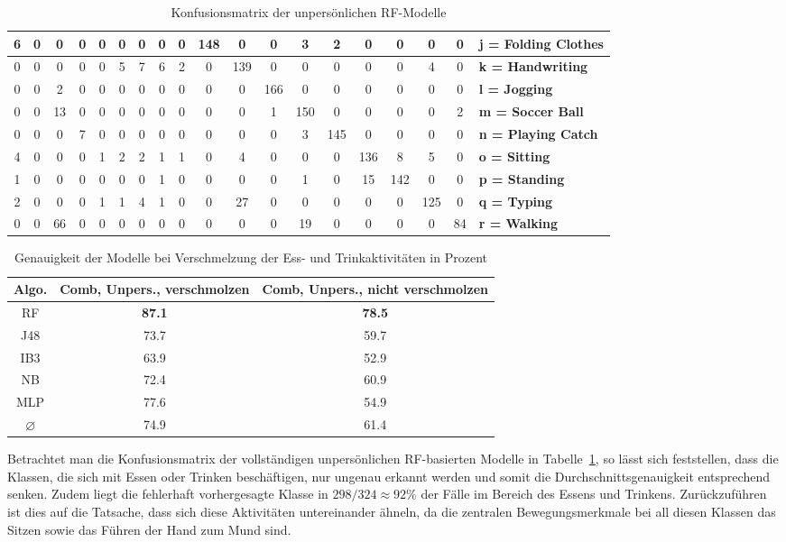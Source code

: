\begin{table}
\begin{tabular}{|c|c|c|c|c|c|c|c|c|c|c|c|c|c|c|c|c|c||l|}
\hline 
6 & 0 & 0 & 0 & 0 & 0 & 0 & 0 & 0 & 148 & 0 & 0 & 3 & 2 & 0 & 0 & 0 & 0 & \textbf{j = Folding Clothes} \\
\hline 
0 & 0 & 0 & 0 & 0 & 5 & 7 & 6 & 2 & 0 & 139 & 0 & 0 & 0 & 0 & 0 & 4 & 0 & \textbf{k = Handwriting} \\
\hline 
0 & 0 & 2 & 0 & 0 & 0 & 0 & 0 & 0 & 0 & 0 & 166 & 0 & 0 & 0 & 0 & 0 & 0 & \textbf{l = Jogging} \\
\hline 
0 & 0 &13 & 0 & 0 & 0 & 0 & 0 & 0 & 0 & 0 & 1 & 150 & 0 & 0 & 0 & 0 & 2 & \textbf{m = Soccer Ball} \\
\hline 
0 & 0 & 0 & 7 & 0 & 0 & 0 & 0 & 0 & 0 & 0 & 0 & 3 & 145 & 0 & 0 & 0 & 0 & \textbf{n = Playing Catch} \\
\hline 
4 & 0 & 0 & 0 & 1 & 2 & 2 & 1 & 1 & 0 & 4 & 0 & 0 & 0 & 136 & 8 & 5 & 0 & \textbf{o = Sitting} \\
\hline 
1 & 0 & 0 & 0 & 0 & 0 & 0 & 1 & 0 & 0 & 0 & 0 & 1 & 0 &15 & 142 & 0 & 0 & \textbf{p = Standing} \\
\hline 
2 & 0 & 0 & 0 & 1 & 1 & 4 & 1 & 0 & 0 & 27 & 0 & 0 & 0 & 0 & 0 & 125 & 0 & \textbf{q = Typing} \\
\hline 
0 & 0 &66 & 0 & 0 & 0 & 0 & 0 & 0 & 0 & 0 & 0 & 19 & 0 & 0 & 0 & 0 & 84 & \textbf{r = Walking} \\
\hline 
\end{tabular}
\caption{Konfusionsmatrix der unpersönlichen \ac{RF}-Modelle}
\label{tab:confusion-impersonal-rf}
\end{table}
\begin{table}
	\centering
	\begin{tabular}{|c|c|c|}
		\hline 
		\textbf{Algo.} & \textbf{Comb, Unpers., verschmolzen} & \textbf{Comb, Unpers., nicht verschmolzen} \\ 
		\hline 
		\acs{RF} & \textbf{87.1} &  \textbf{78.5} \\ 
		\acs{J48} & 73.7 &  59.7 \\ 
		\acs{IB}3 & 63.9 &  52.9  \\ 
		\acs{NB} & 72.4 & 60.9  \\ 
		\acs{MLP} & 77.6  & 54.9 \\ 
		\hline 
		$\varnothing$ & 74.9 & 61.4  \\ 
		\hline
	\end{tabular} 
	\caption{Genauigkeit der Modelle bei Verschmelzung der Ess- und Trinkaktivitäten in Prozent}
	\label{tab:accuracy-merge-eating}
\end{table}

Betrachtet man die Konfusionsmatrix der vollständigen unpersönlichen \acs{RF}-basierten Modelle in Tabelle~\ref{tab:confusion-impersonal-rf}, so lässt sich feststellen, dass die Klassen, die sich mit Essen oder Trinken beschäftigen, nur ungenau erkannt werden und somit die Durchschnittsgenauigkeit entsprechend senken. Zudem liegt die fehlerhaft vorhergesagte Klasse in $298/324 \approx 92 \%$ der Fälle im Bereich des Essens und Trinkens. Zurückzuführen ist dies auf die Tatsache, dass sich diese Aktivitäten untereinander ähneln, da die zentralen Bewegungsmerkmale bei all diesen Klassen das Sitzen sowie das Führen der Hand zum Mund sind.


